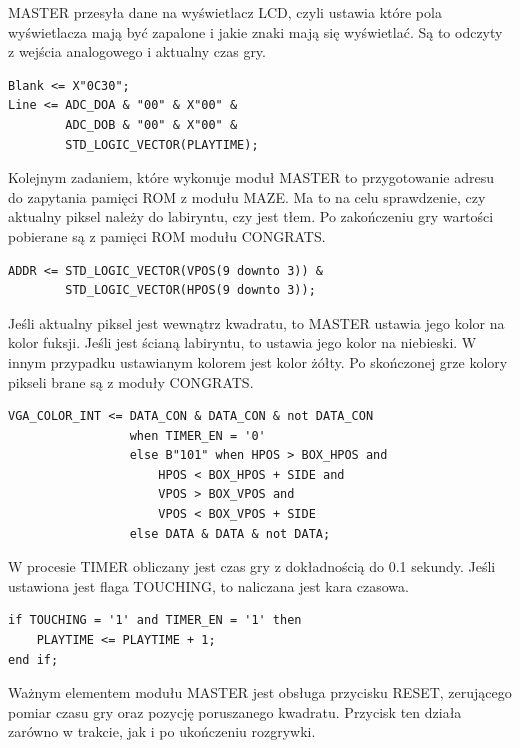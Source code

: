 \documentclass[11pt]{article}
\begin{document}
MASTER przesyła dane na wyświetlacz LCD, czyli ustawia które pola wyświetlacza mają być zapalone i jakie znaki mają się wyświetlać.
Są to odczyty z wejścia analogowego i aktualny czas gry.

\begin{lstlisting}[caption=Sterowanie wyświetlaczem LCD]
Blank <= X"0C30";
Line <= ADC_DOA & "00" & X"00" &
        ADC_DOB & "00" & X"00" &
        STD_LOGIC_VECTOR(PLAYTIME);
\end{lstlisting}	

Kolejnym zadaniem, które wykonuje moduł MASTER to przygotowanie adresu do zapytania pamięci ROM z modułu MAZE.
Ma to na celu sprawdzenie, czy aktualny piksel należy do labiryntu, czy jest tłem.
Po zakończeniu gry wartości pobierane są z pamięci ROM modułu CONGRATS.

\begin{lstlisting}[caption=Ustawienie adresu w pamięci ROM]
ADDR <= STD_LOGIC_VECTOR(VPOS(9 downto 3)) &
        STD_LOGIC_VECTOR(HPOS(9 downto 3));
\end{lstlisting}

Jeśli aktualny piksel jest wewnątrz kwadratu, to MASTER ustawia jego kolor na kolor fuksji.
Jeśli jest ścianą labiryntu, to ustawia jego kolor na niebieski.
W innym przypadku ustawianym kolorem jest kolor żółty.
Po skończonej grze kolory pikseli brane są z moduły CONGRATS.

\begin{lstlisting}[caption=Sterowanie kolorem]
VGA_COLOR_INT <= DATA_CON & DATA_CON & not DATA_CON
                 when TIMER_EN = '0'
                 else B"101" when HPOS > BOX_HPOS and
                     HPOS < BOX_HPOS + SIDE and
                     VPOS > BOX_VPOS and
                     VPOS < BOX_VPOS + SIDE
                 else DATA & DATA & not DATA;

\end{lstlisting}

W procesie TIMER obliczany jest czas gry z dokładnością do 0.1 sekundy. 
Jeśli ustawiona jest flaga TOUCHING, to naliczana jest kara czasowa.

\begin{lstlisting}[caption=Naliczanie kary czasowej]
if TOUCHING = '1' and TIMER_EN = '1' then
    PLAYTIME <= PLAYTIME + 1;
end if;
\end{lstlisting}

Ważnym elementem modułu MASTER jest obsługa przycisku RESET, zerującego pomiar czasu gry oraz pozycję poruszanego kwadratu. 
Przycisk ten działa zarówno w trakcie, jak i po ukończeniu rozgrywki. 
\end{document}
